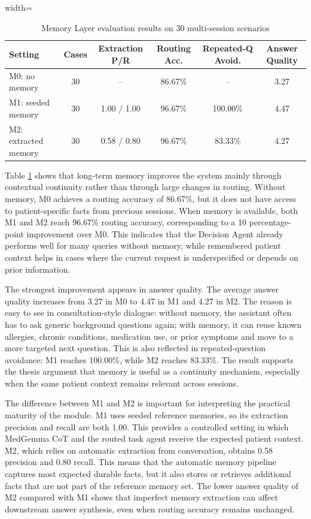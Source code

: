 \begin{table}[H]
\centering
\begin{adjustbox}{width=\textwidth}
\begin{tabular}{l c c c c c}
\hline\hline
Setting & Cases & Extraction P/R &  Routing Acc. & Repeated-Q Avoid. & Answer Quality \\
\hline
M0: no memory & 30 & -- & 86.67\% & -- & 3.27 \\
M1: seeded memory & 30 & 1.00 / 1.00 & 96.67\% & 100.00\% & 4.47 \\
M2: extracted memory & 30 & 0.58 / 0.80 & 96.67\% & 83.33\% & 4.27 \\
\hline\hline
\end{tabular}
\end{adjustbox}
\caption{Memory Layer evaluation results on 30 multi-session scenarios}
\label{table:memory-layer-evaluation}
\end{table}

Table \ref{table:memory-layer-evaluation} shows that long-term memory improves the system mainly through contextual continuity rather than through large changes in routing. Without memory, M0 achieves a routing accuracy of 86.67\%, but it does not have access to patient-specific facts from previous sessions. When memory is available, both M1 and M2 reach 96.67\% routing accuracy, corresponding to a 10 percentage-point improvement over M0. This indicates that the Decision Agent already performs well for many queries without memory, while remembered patient context helps in cases where the current request is underspecified or depends on prior information.

The strongest improvement appears in answer quality. The average answer quality increases from 3.27 in M0 to 4.47 in M1 and 4.27 in M2. The reason is easy to see in consultation-style dialogue: without memory, the assistant often has to ask generic background questions again; with memory, it can reuse known allergies, chronic conditions, medication use, or prior symptoms and move to a more targeted next question. This is also reflected in repeated-question avoidance: M1 reaches 100.00\%, while M2 reaches 83.33\%. The result supports the thesis argument that memory is useful as a continuity mechanism, especially when the same patient context remains relevant across sessions.

The difference between M1 and M2 is important for interpreting the practical maturity of the module. M1 uses seeded reference memories, so its extraction precision and recall are both 1.00. This provides a controlled setting in which MedGemma CoT and the routed task agent receive the expected patient context. M2, which relies on automatic extraction from conversation, obtains 0.58 precision and 0.80 recall. This means that the automatic memory pipeline captures most expected durable facts, but it also stores or retrieves additional facts that are not part of the reference memory set. The lower answer quality of M2 compared with M1 shows that imperfect memory extraction can affect downstream answer synthesis, even when routing accuracy remains unchanged.

